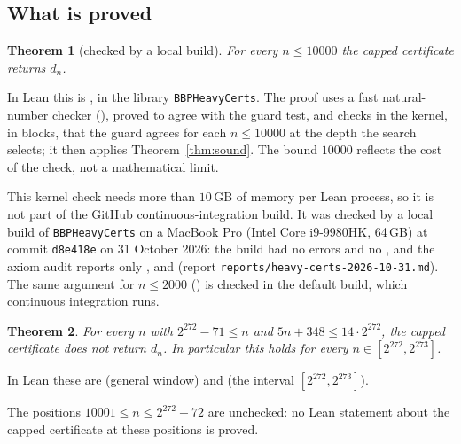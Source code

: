 \documentclass[11pt]{amsart}
\newtheorem{theorem}{Theorem}[section]
\theoremstyle{definition}
\theoremstyle{remark}
\begin{document}
\subsection{What is proved}

\begin{theorem}[checked by a local build]\label{thm:cap10000}
For every $n\le10000$ the capped certificate returns $d_n$.
\end{theorem}

In Lean this is , in
the library \texttt{BBPHeavyCerts}. The proof uses a fast natural-number
checker (), proved to agree with the guard test, and
checks in the kernel, in blocks, that the guard agrees for each $n\le10000$
at the depth the search selects; it then applies Theorem~\ref{thm:sound}.
The bound $10000$ reflects the cost of the check, not a mathematical limit.

This kernel check needs more than $10$\,GB of memory per Lean process, so it
is not part of the GitHub continuous-integration build. It was checked by a
local build of \texttt{BBPHeavyCerts} on a MacBook Pro (Intel Core i9-9980HK,
64\,GB) at commit \texttt{d8e418e} on 31 October 2026: the build had no errors
and no , and the axiom audit 
reports only ,  and 
(report \texttt{reports/heavy-certs-2026-10-31.md}). The same argument
for $n\le2000$ () is
checked in the default build, which continuous integration runs.

\begin{theorem}\label{thm:capwrong}
For every $n$ with $2^{272}-71\le n$ and $5n+348\le14\cdot2^{272}$, the capped
certificate does not return $d_n$. In particular this holds for every
$n\in[2^{272},2^{273}]$.
\end{theorem}

In Lean these are  (general window)
and  (the interval
$[2^{272},2^{273}]$).

The positions $10001\le n\le2^{272}-72$ are unchecked: no Lean statement
about the capped certificate at these positions is proved.
\end{document}
